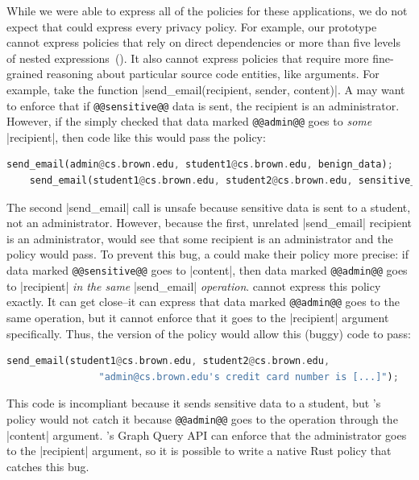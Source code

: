 While we were able to express all of the policies for these applications,
we do not expect that \syslang{} could express every privacy policy.
%
For example, our \syslang{} prototype cannot express policies that rely on direct dependencies 
or more than five levels of nested expressions~().
%
It also cannot express policies that require more fine-grained reasoning about particular source code
entities, like arguments.
%
For example, take the function |send_email(recipient, sender, content)|.
%
A \ce{} may want to enforce that if \lstinline[language=CNL]|@@sensitive@@| data is sent,
the recipient is an administrator.
%
However, if the \ce{} simply checked that data marked \lstinline[language=CNL]|@@admin@@| goes to \emph{some} |recipient|,
then code like this would pass the policy:
\begin{lstlisting}[language=Rust]
    send_email(admin@cs.brown.edu, student1@cs.brown.edu, benign_data);
    send_email(student1@cs.brown.edu, student2@cs.brown.edu, sensitive_data);
\end{lstlisting}
The second |send_email| call is unsafe because sensitive data is sent to a student, not an administrator.
%
However, because the first, unrelated |send_email| recipient is an administrator, 
\sys{} would see that some recipient is an administrator and the policy would pass.
%
To prevent this bug, a \ce{} could make their policy more precise: if data marked \lstinline[language=CNL]|@@sensitive@@| goes to |content|,
then data marked \lstinline[language=CNL]|@@admin@@| goes to |recipient| \emph{in the same} |send_email| \emph{operation}.
%
\syslang{} cannot express this policy exactly.
%
It can get close--it can express that data marked \lstinline[language=CNL]|@@admin@@| goes to the same operation,
but it cannot enforce that it goes to the |recipient| argument specifically.
%
Thus, the \syslang{} version of the policy would allow this (buggy) code to pass:
\begin{lstlisting}[language=Rust]
    send_email(student1@cs.brown.edu, student2@cs.brown.edu, 
                "admin@cs.brown.edu's credit card number is [...]");
\end{lstlisting}
%
This code is incompliant because it sends sensitive data to a student,
but \syslang{}'s policy would not catch it because \lstinline[language=CNL]|@@admin@@| goes to 
the operation through the |content| argument.
%
\sys{}'s Graph Query API can enforce that the administrator goes to the |recipient| argument,
so it is possible to write a native Rust policy that catches this bug.

